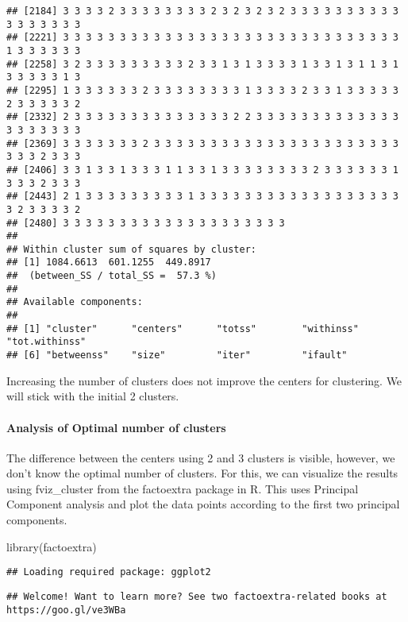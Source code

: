 \documentclass[
]{article}
\newenvironment{Shaded}{\begin{snugshade}}{\end{snugshade}}
\newcommand{\FunctionTok}[1]{\textcolor[rgb]{0.00,0.00,0.00}{#1}}
\newcommand{\NormalTok}[1]{#1}
\begin{document}
\begin{verbatim}
## [2184] 3 3 3 3 2 3 3 3 3 3 3 3 3 2 3 2 3 2 3 2 3 3 3 3 3 3 3 3 3 3 3 3 3 3 3 3 3
## [2221] 3 3 3 3 3 3 3 3 3 3 3 3 3 3 3 3 3 3 3 3 3 3 3 3 3 3 3 3 3 3 1 3 3 3 3 3 3
## [2258] 3 2 3 3 3 3 3 3 3 3 3 2 3 3 1 3 1 3 3 3 3 1 3 3 1 3 1 1 3 1 3 3 3 3 3 1 3
## [2295] 1 3 3 3 3 3 3 2 3 3 3 3 3 3 3 3 1 3 3 3 3 2 3 3 1 3 3 3 3 3 2 3 3 3 3 3 2
## [2332] 2 3 3 3 3 3 3 3 3 3 3 3 3 3 3 2 2 3 3 3 3 3 3 3 3 3 3 3 3 3 3 3 3 3 3 3 3
## [2369] 3 3 3 3 3 3 3 2 3 3 3 3 3 3 3 3 3 3 3 3 3 3 3 3 3 3 3 3 3 3 3 3 3 2 3 3 3
## [2406] 3 3 1 3 3 1 3 3 3 1 1 3 3 1 3 3 3 3 3 3 3 3 2 3 3 3 3 3 3 1 3 3 3 2 3 3 3
## [2443] 2 1 3 3 3 3 3 3 3 3 3 1 3 3 3 3 3 3 3 3 3 3 3 3 3 3 3 3 3 3 3 2 3 3 3 3 2
## [2480] 3 3 3 3 3 3 3 3 3 3 3 3 3 3 3 3 3 3 3 3
## 
## Within cluster sum of squares by cluster:
## [1] 1084.6613  601.1255  449.8917
##  (between_SS / total_SS =  57.3 %)
## 
## Available components:
## 
## [1] "cluster"      "centers"      "totss"        "withinss"     "tot.withinss"
## [6] "betweenss"    "size"         "iter"         "ifault"
\end{verbatim}

Increasing the number of clusters does not improve the centers for
clustering. We will stick with the initial 2 clusters.

\hypertarget{analysis-of-optimal-number-of-clusters}{%
\paragraph{Analysis of Optimal number of
clusters}\label{analysis-of-optimal-number-of-clusters}}

The difference between the centers using 2 and 3 clusters is visible,
however, we don't know the optimal number of clusters. For this, we can
visualize the results using fviz\_cluster from the factoextra package in
R. This uses Principal Component analysis and plot the data points
according to the first two principal components.

\begin{Shaded}
\begin{Highlighting}[]
\FunctionTok{library}\NormalTok{(factoextra)}
\end{Highlighting}
\end{Shaded}

\begin{verbatim}
## Loading required package: ggplot2
\end{verbatim}

\begin{verbatim}
## Welcome! Want to learn more? See two factoextra-related books at https://goo.gl/ve3WBa
\end{verbatim}
\end{document}
